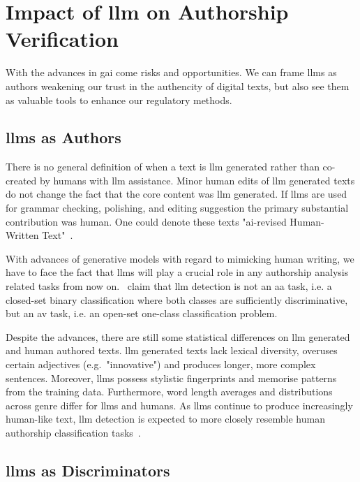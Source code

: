 \section{Impact of \acs{llm} on Authorship Verification}

With the advances in \ac{gai} come risks and opportunities.
We can frame \acp{llm} as authors weakening our trust in the authencity of digital texts, but also see them as valuable tools to enhance our regulatory methods.

\subsection{\acsp{llm} as Authors}
There is no general definition of when a text is \ac{llm} generated rather than co-created by humans with \ac{llm} assistance.
Minor human edits of \ac{llm} generated texts do not change the fact that the core content was \ac{llm} generated.
If \acp{llm} are used for grammar checking, polishing, and editing suggestion the primary substantial contribution was human.
One could denote these texts "\ac{ai}-revised Human-Written Text"~\citep{wang_stumbling_2024}.

With advances of generative models with regard to mimicking human writing, we have to face the fact that \acp{llm} will play a crucial role in any authorship analysis related tasks from now on.
\citet{llm_detection_av_2025}\ claim that \ac{llm} detection is not an \ac{aa} task, i.e. a closed-set binary classification where both classes are sufficiently discriminative, but an \ac{av} task, i.e. an open-set one-class classification problem. 

Despite the advances, there are still some statistical differences on \ac{llm} generated and human authored texts.
\ac{llm} generated texts lack lexical diversity, overuses certain adjectives (e.g.\ "innovative") and produces longer, more complex sentences.
Moreover, \acp{llm} possess stylistic fingerprints and memorise patterns from the training data.
Furthermore, word length averages and distributions across genre differ for \acp{llm} and humans.
As \acp{llm} continue to produce increasingly human-like text, \ac{llm} detection is expected to more closely resemble human authorship classification tasks~\citep{llm_detection_av_2025}.


\subsection{\acsp{llm} as Discriminators}
\label{sec:llm_discriminator}

